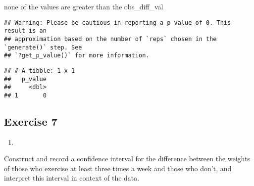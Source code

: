 \documentclass[
]{article}
\newenvironment{Shaded}{\begin{snugshade}}{\end{snugshade}}
\newcommand{\CommentTok}[1]{\textcolor[rgb]{0.56,0.35,0.01}{\textit{#1}}}
\newcommand{\DataTypeTok}[1]{\textcolor[rgb]{0.13,0.29,0.53}{#1}}
\newcommand{\DecValTok}[1]{\textcolor[rgb]{0.00,0.00,0.81}{#1}}
\newcommand{\FloatTok}[1]{\textcolor[rgb]{0.00,0.00,0.81}{#1}}
\newcommand{\KeywordTok}[1]{\textcolor[rgb]{0.13,0.29,0.53}{\textbf{#1}}}
\newcommand{\NormalTok}[1]{#1}
\newcommand{\OperatorTok}[1]{\textcolor[rgb]{0.81,0.36,0.00}{\textbf{#1}}}
\newcommand{\OtherTok}[1]{\textcolor[rgb]{0.56,0.35,0.01}{#1}}
\newcommand{\StringTok}[1]{\textcolor[rgb]{0.31,0.60,0.02}{#1}}
\begin{document}
none of the values are greater than the obs\_diff\_val

\begin{Shaded}
\end{Shaded}

\begin{verbatim}
## Warning: Please be cautious in reporting a p-value of 0. This result is an
## approximation based on the number of `reps` chosen in the `generate()` step. See
## `?get_p_value()` for more information.
\end{verbatim}

\begin{verbatim}
## # A tibble: 1 x 1
##   p_value
##     <dbl>
## 1       0
\end{verbatim}

\hypertarget{exercise-7}{%
\subsection{Exercise 7}\label{exercise-7}}

\begin{enumerate}
\def\labelenumi{\arabic{enumi}.}
\item
\end{enumerate}

Construct and record a confidence interval for the difference between
the weights of those who exercise at least three times a week and those
who don't, and interpret this interval in context of the data.

\begin{Shaded}
\end{Shaded}
\end{document}
